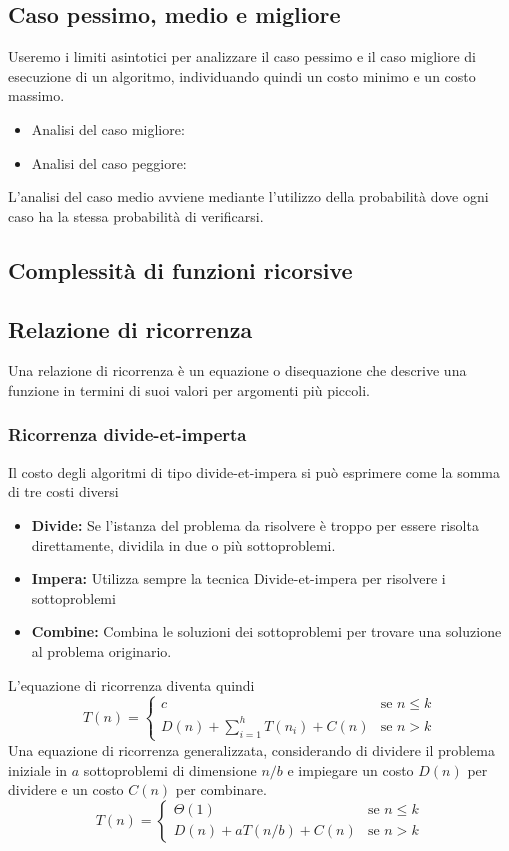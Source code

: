 \documentclass{article}
\begin{document}
\subsection{Caso pessimo, medio e migliore}
Useremo i limiti asintotici per analizzare il caso pessimo e il caso migliore di esecuzione di un algoritmo, individuando quindi un costo minimo e un costo massimo.
\begin{itemize}
  \item Analisi del caso migliore:
  \item Analisi del caso peggiore:
\end{itemize}
L'analisi del caso medio avviene mediante l'utilizzo della probabilità dove ogni caso ha la stessa probabilità di verificarsi.

\subsection{Complessità di funzioni ricorsive}
\subsection*{Relazione di ricorrenza}
Una relazione di ricorrenza è un equazione o disequazione che descrive una funzione in termini di suoi valori per argomenti più piccoli.
\subsubsection*{Ricorrenza divide-et-imperta}
Il costo degli algoritmi di tipo divide-et-impera si può esprimere come la somma di tre costi diversi
\begin{itemize}
  \item \textbf{Divide:} Se l'istanza del problema da risolvere è troppo  per essere risolta direttamente, dividila in due o più sottoproblemi.
  \item \textbf{Impera:} Utilizza sempre la tecnica Divide-et-impera per risolvere i sottoproblemi
  \item \textbf{Combine:} Combina le soluzioni dei sottoproblemi per trovare una soluzione al problema originario.
\end{itemize}
L'equazione di ricorrenza diventa quindi
\begin{equation*}
  T(n) =
  \begin{cases}
    c                                   & \text{se } n \leq k \\
    D(n) + \sum_{i = 1}^h T(n_i) + C(n) & \text{se } n > k
  \end{cases}
\end{equation*}
Una equazione di ricorrenza generalizzata, considerando di dividere il problema iniziale in \(a\) sottoproblemi di dimensione \(n/b\) e impiegare un costo \(D(n)\) per dividere e un costo \(C(n)\) per combinare.
\begin{equation*}
  T(n) =
  \begin{cases}
    \Theta(1)             & \text{se } n \leq k \\
    D(n) + aT(n/b) + C(n) & \text{se } n > k
  \end{cases}
\end{equation*}
\end{document}
